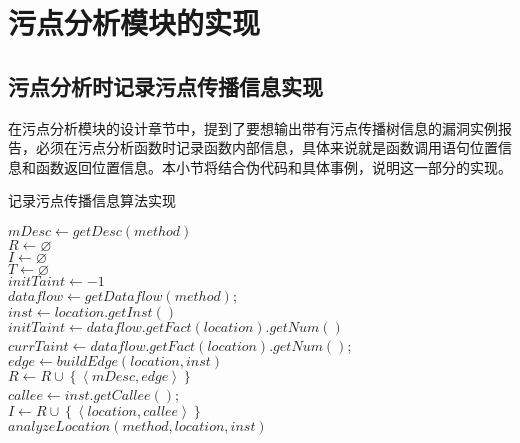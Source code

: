 \section{污点分析模块的实现}\label{sec:taintImp}
\subsection{污点分析时记录污点传播信息实现}
在污点分析模块的设计章节中，提到了要想输出带有污点传播树信息的漏洞实例报告，必须在污点分析函数时记录函数内部信息，具体来说就是函数调用语句位置信息和函数返回位置信息。本小节将结合伪代码和具体事例，说明这一部分的实现。

\begin{algorithm}[!htb]\footnotesize
\caption{记录污点传播信息算法实现}
\label{alg:noteTaint}
$mDesc \leftarrow getDesc(method)$\\
$R \leftarrow \varnothing $\\
$I \leftarrow \varnothing $\\
$T \leftarrow \varnothing $\\
$initTaint \leftarrow -1$\\
$dataflow \leftarrow getDataflow(method)$;\\
 {
     {
        $inst \leftarrow location.getInst()$\\
         {
            $initTaint \leftarrow dataflow.getFact(location).getNum()$\\
        }
         {
            $currTaint \leftarrow dataflow.getFact(location).getNum()$;\\
             {
                $edge \leftarrow buildEdge(location, inst)$\\
                $R \leftarrow R \cup \left\{ \left\langle mDesc, edge \right\rangle \right\}$\\
            }
        }
         {
            $callee \leftarrow inst.getCallee()$;\\
            $I \leftarrow R \cup \left\{ \left\langle location, callee \right\rangle \right\}$\\
            $analyzeLocation(method, location, inst)$\\
        }
    }
}
\end{algorithm}

